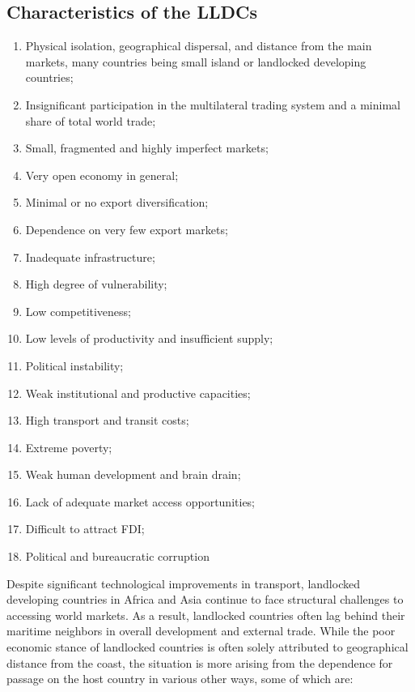 \documentclass[
  openany]{book}
\providecommand{\tightlist}{%
  \setlength{\itemsep}{0pt}\setlength{\parskip}{0pt}}
\begin{document}
\hypertarget{characteristics-of-the-lldcs}{%
\subsection{Characteristics of the LLDCs}\label{characteristics-of-the-lldcs}}

\begin{enumerate}
\def\labelenumi{\arabic{enumi}.}
\tightlist
\item
  Physical isolation, geographical dispersal, and distance from the main markets, many countries being small island or landlocked developing countries;
\item
  Insignificant participation in the multilateral trading system and a minimal share of total world trade;
\item
  Small, fragmented and highly imperfect markets;
\item
  Very open economy in general;
\item
  Minimal or no export diversification;
\item
  Dependence on very few export markets;
\item
  Inadequate infrastructure;
\item
  High degree of vulnerability;
\item
  Low competitiveness;
\item
  Low levels of productivity and insufficient supply;
\item
  Political instability;
\item
  Weak institutional and productive capacities;
\item
  High transport and transit costs;
\item
  Extreme poverty;
\item
  Weak human development and brain drain;
\item
  Lack of adequate market access opportunities;
\item
  Difficult to attract FDI;
\item
  Political and bureaucratic corruption
\end{enumerate}

Despite significant technological improvements in transport, landlocked developing countries in Africa and Asia continue to face structural challenges to accessing world markets. As a result, landlocked countries often lag behind their maritime neighbors in overall development and external trade. While the poor economic stance of landlocked countries is often solely attributed to geographical distance from the coast, the situation is more arising from the dependence for passage on the host country in various other ways, some of which are:
\end{document}

